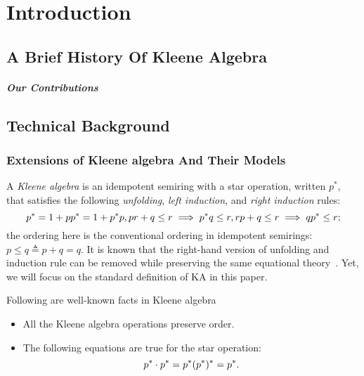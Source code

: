 \chapter{Introduction}
\label{chapter:introduction}
\thispagestyle{myheadings}

\section{A Brief History Of Kleene Algebra}
\label{sec:history}

\paragraph{Our Contributions}

\section{Technical Background}

\subsection{Extensions of Kleene algebra And Their Models}

A \emph{Kleene algebra} is an idempotent semiring with a star operation, written
$p^*$, that satisfies the following \emph{unfolding}, \emph{left induction},
and \emph{right induction} rules:
\[
    p^* = 1 + p p^* = 1 + p^* p, \\
    p r + q  \leq  r  \implies  p^* q  \leq  r, \\
    r p + q  \leq  r  \implies  q p^*  \leq  r;
\]
the ordering here is the conventional ordering in idempotent semirings: \(p  \leq  q  \triangleq  p + q = q.\)
It is known that the right-hand version of unfolding and induction rule 
can be removed while preserving the same equational theory~\cite{Kozen_Silva_2020}.
Yet, we will focus on the standard definition of KA in this paper.
\begin{lemma}\label{the: well known fact about KA}
    Following are well-known facts in Kleene algebra
    \begin{itemize}
        \item All the Kleene algebra operations preserve order.
        \item The following equations are true for the star operation:
              \[ p^*  \cdot  p^* = p^* \\ (p^*)^* = p^*.\]
    \end{itemize}
\end{lemma}

